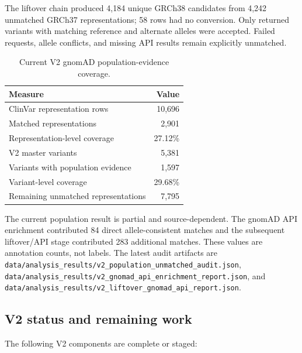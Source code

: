 \documentclass[12pt,a4paper]{article}
\newcommand{\code}[1]{\nolinkurl{#1}}
\begin{document}
The liftover chain produced 4,184 unique GRCh38 candidates from 4,242
unmatched GRCh37 representations; 58 rows had no conversion. Only returned
variants with matching reference and alternate alleles were accepted. Failed
requests, allele conflicts, and missing API results remain explicitly
unmatched.

\begin{table}[H]
\centering
\small
\caption{Current V2 gnomAD population-evidence coverage.}
\label{tab:v2population}
\begin{tabular}{lr}
\toprule
Measure & Value\\
\midrule
ClinVar representation rows & 10,696\\
Matched representations & 2,901\\
Representation-level coverage & 27.12\%\\
V2 master variants & 5,381\\
Variants with population evidence & 1,597\\
Variant-level coverage & 29.68\%\\
Remaining unmatched representations & 7,795\\
\bottomrule
\end{tabular}
\end{table}

The current population result is partial and source-dependent. The gnomAD API
enrichment contributed 84 direct allele-consistent matches and the subsequent
liftover/API stage contributed 283 additional matches. These values are
annotation counts, not labels. The latest audit artifacts are
\code{data/analysis\_results/v2\_population\_unmatched\_audit.json},
\code{data/analysis\_results/v2\_gnomad\_api\_enrichment\_report.json},
and \code{data/analysis\_results/v2\_liftover\_gnomad\_api\_report.json}.

\subsection{V2 status and remaining work}
The following V2 components are complete or staged:
\end{document}
